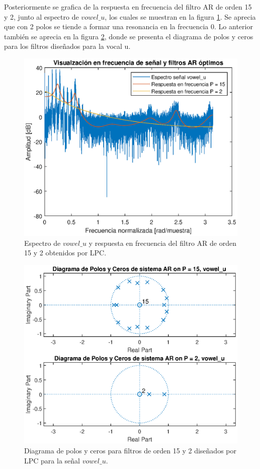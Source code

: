 Posteriormente se grafica de la respuesta en frecuencia del filtro AR de orden 15 y 2, junto al espectro de $vowel\_u$, los cuales se muestran en la figura \ref{fig:p4_23}. Se aprecia que con 2 polos se tiende a formar una resonancia en la frecuencia 0. Lo anterior también se aprecia en la figura \ref{fig:p4_24}, donde se presenta el diagrama de polos y ceros para los filtros diseñados para la vocal u.

\begin{figure}[H]
    \centering
    \includegraphics[width = .8\linewidth]{figures/p4_23.eps}
    \caption{Espectro de $vowel\_u$ y respuesta en frecuencia del filtro AR de orden 15 y 2 obtenidos por LPC.}
    \label{fig:p4_23}
\end{figure}

\begin{figure}[H]
    \centering
    \includegraphics[width = .8\linewidth]{figures/p4_24.eps}
    \caption{Diagrama de polos y ceros para filtros de orden 15 y 2 diseñados por LPC para la señal $vowel\_u$.}
    \label{fig:p4_24}
\end{figure}




